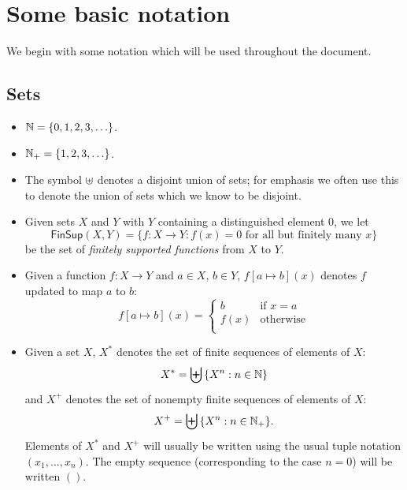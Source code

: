 \section{Some basic notation}
\label{sec:notation}
We begin with some notation which will be used throughout the document.

\subsection{Sets}
\label{sec:notation-sets}
\begin{itemize}

  \item $\mathbb{N} = \{0,1,2,3,\ldots\}$.%

  \item $\mathbb{N}_{+} = \{1,2,3,\ldots\}$.%

  \item The symbol $\uplus$ denotes a disjoint union of sets;  for emphasis we often use this
    to denote the union of sets which we know to be disjoint.%

  \item Given sets $X$ and $Y$ with $Y$ containing a distinguished element 0, we let
    $$ \textsf{FinSup}(X,Y) = \{f:X \rightarrow Y: f(x) = 0 \text{ for all but finitely many $x$}\}$$
    be the set of \textit{finitely supported functions} from $X$ to $Y$.%

  \item Given a function $f: X \rightarrow Y$ and $a \in X$, $b \in Y$, $f[a \mapsto b](x)$
    denotes $f$ updated to map $a$ to $b$:
    $$ f[a \mapsto b](x) = \left\{
    \begin{array}{ll}
      b & \text{if $x=a$}\\
      f(x) & \text{otherwise}\\
    \end{array}\right.
    $$

  \item Given a set $X$, $X^*$ denotes the set of finite sequences of elements of $X$:
    $$
    X^* = \biguplus{\{X^n: n \in \mathbb{N}\}}
    $$%
    and $X^+$ denotes the set of nonempty finite sequences of elements of $X$:
    $$
    X^+ = \biguplus{\{X^n: n \in \mathbb{N}_{+}\}}.
    $$
    Elements of $X^*$ and $X^+$ will usually be written using the usual tuple
    notation $(x_1, \ldots, x_n)$. The empty sequence (corresponding to the case
    $n=0$) will be written $()$.


\end{itemize}
